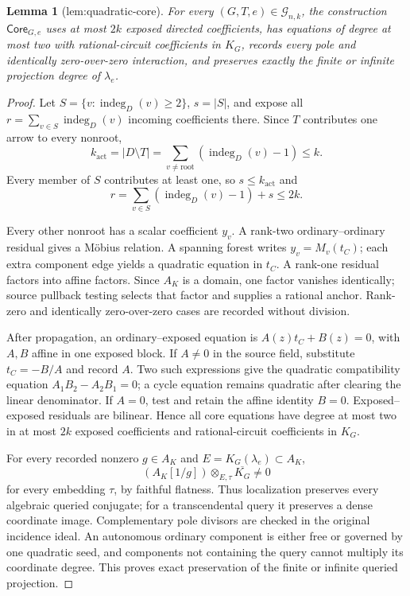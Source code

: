 \documentclass{article}
\newtheorem{lemma}{Lemma}
\begin{document}
\begin{lemma}[lem:quadratic-core]\label{lem:quadratic-core}
For every \((G,T,e)\in\mathcal G_{n,k}\), the construction \(\mathsf{Core}_{G,e}\) uses at most \(2k\) exposed directed coefficients, has equations of degree at most two with rational-circuit coefficients in \(K_G\), records every pole and identically zero-over-zero interaction, and preserves exactly the finite or infinite projection degree of \(\lambda_e\).
\end{lemma}
\begin{proof}
Let \(S=\{v:\operatorname{indeg}_D(v)\ge2\}\), \(s=|S|\), and expose all \(r=\sum_{v\in S}\operatorname{indeg}_D(v)\) incoming coefficients there. Since \(T\) contributes one arrow to every nonroot,
\[
k_{\mathrm{act}}=|D\setminus T|
=\sum_{v\ne\mathrm{root}}(\operatorname{indeg}_D(v)-1)\le k.
\]
Every member of \(S\) contributes at least one, so \(s\le k_{\mathrm{act}}\) and
\[
r=\sum_{v\in S}(\operatorname{indeg}_D(v)-1)+s\le2k.
\]

Every other nonroot has a scalar coefficient \(y_v\). A rank-two ordinary--ordinary residual gives a Möbius relation. A spanning forest writes \(y_v=M_v(t_C)\); each extra component edge yields a quadratic equation in \(t_C\). A rank-one residual factors into affine factors. Since \(A_K\) is a domain, one factor vanishes identically; source pullback testing selects that factor and supplies a rational anchor. Rank-zero and identically zero-over-zero cases are recorded without division.

After propagation, an ordinary--exposed equation is \(A(z)t_C+B(z)=0\), with \(A,B\) affine in one exposed block. If \(A\ne0\) in the source field, substitute \(t_C=-B/A\) and record \(A\). Two such expressions give the quadratic compatibility equation \(A_1B_2-A_2B_1=0\); a cycle equation remains quadratic after clearing the linear denominator. If \(A=0\), test and retain the affine identity \(B=0\). Exposed--exposed residuals are bilinear. Hence all core equations have degree at most two in at most \(2k\) exposed coefficients and rational-circuit coefficients in \(K_G\).

For every recorded nonzero \(g\in A_K\) and \(E=K_G(\lambda_e)\subset A_K\),
\[
(A_K[1/g])\otimes_{E,\tau}\overline{K_G}\ne0
\]
for every embedding \(\tau\), by faithful flatness. Thus localization preserves every algebraic queried conjugate; for a transcendental query it preserves a dense coordinate image. Complementary pole divisors are checked in the original incidence ideal. An autonomous ordinary component is either free or governed by one quadratic seed, and components not containing the query cannot multiply its coordinate degree. This proves exact preservation of the finite or infinite queried projection.
\end{proof}
\end{document}

